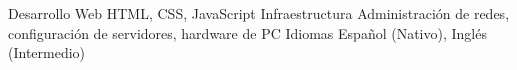 \begin{cvskills}
  \cvskill
    {Desarrollo Web}
    {HTML, CSS, JavaScript}
  \cvskill
    {Infraestructura}
    {Administración de redes, configuración de servidores, hardware de PC}
  \cvskill
    {Idiomas}
    {Español (Nativo), Inglés (Intermedio)}
\end{cvskills}
